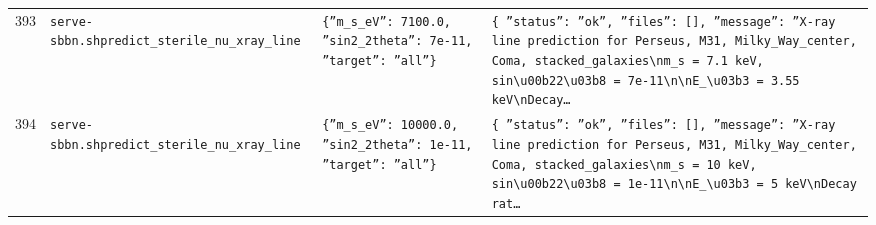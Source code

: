 \documentclass[11pt,a4paper]{article}
\begin{document}
\begin{longtable}{@{}p{}p{}p{}p{}@{}}
393 & \texttt{serve-sbbn.sh}\newline\texttt{predict\_\allowbreak{}sterile\_\allowbreak{}nu\_\allowbreak{}xray\_\allowbreak{}line} & \texttt{\{''m\_\allowbreak{}s\_\allowbreak{}eV'':\allowbreak{} 7100.0,\allowbreak{} ''sin2\_\allowbreak{}2theta'':\allowbreak{} 7e-11,\allowbreak{} ''target'':\allowbreak{} ''all''\}\allowbreak{}} & \texttt{\{   ''status'':\allowbreak{} ''ok'',\allowbreak{}   ''files'':\allowbreak{} []\allowbreak{},\allowbreak{}   ''message'':\allowbreak{} ''X-ray line prediction for Perseus,\allowbreak{} M31,\allowbreak{} Milky\_\allowbreak{}Way\_\allowbreak{}center,\allowbreak{} Coma,\allowbreak{} stacked\_\allowbreak{}galaxies\textbackslash{}\allowbreak{}nm\_\allowbreak{}s =\allowbreak{} 7.1 keV,\allowbreak{} sin\textbackslash{}\allowbreak{}u00b22\textbackslash{}\allowbreak{}u03b8 =\allowbreak{} 7e-11\textbackslash{}\allowbreak{}n\textbackslash{}\allowbreak{}nE\_\allowbreak{}\textbackslash{}\allowbreak{}u03b3 =\allowbreak{} 3.55 keV\textbackslash{}\allowbreak{}nDecay\ldots{}\allowbreak{}} \\
394 & \texttt{serve-sbbn.sh}\newline\texttt{predict\_\allowbreak{}sterile\_\allowbreak{}nu\_\allowbreak{}xray\_\allowbreak{}line} & \texttt{\{''m\_\allowbreak{}s\_\allowbreak{}eV'':\allowbreak{} 10000.0,\allowbreak{} ''sin2\_\allowbreak{}2theta'':\allowbreak{} 1e-11,\allowbreak{} ''target'':\allowbreak{} ''all''\}\allowbreak{}} & \texttt{\{   ''status'':\allowbreak{} ''ok'',\allowbreak{}   ''files'':\allowbreak{} []\allowbreak{},\allowbreak{}   ''message'':\allowbreak{} ''X-ray line prediction for Perseus,\allowbreak{} M31,\allowbreak{} Milky\_\allowbreak{}Way\_\allowbreak{}center,\allowbreak{} Coma,\allowbreak{} stacked\_\allowbreak{}galaxies\textbackslash{}\allowbreak{}nm\_\allowbreak{}s =\allowbreak{} 10 keV,\allowbreak{} sin\textbackslash{}\allowbreak{}u00b22\textbackslash{}\allowbreak{}u03b8 =\allowbreak{} 1e-11\textbackslash{}\allowbreak{}n\textbackslash{}\allowbreak{}nE\_\allowbreak{}\textbackslash{}\allowbreak{}u03b3 =\allowbreak{} 5 keV\textbackslash{}\allowbreak{}nDecay rat\ldots{}\allowbreak{}} \\

\end{longtable}
\end{document}
